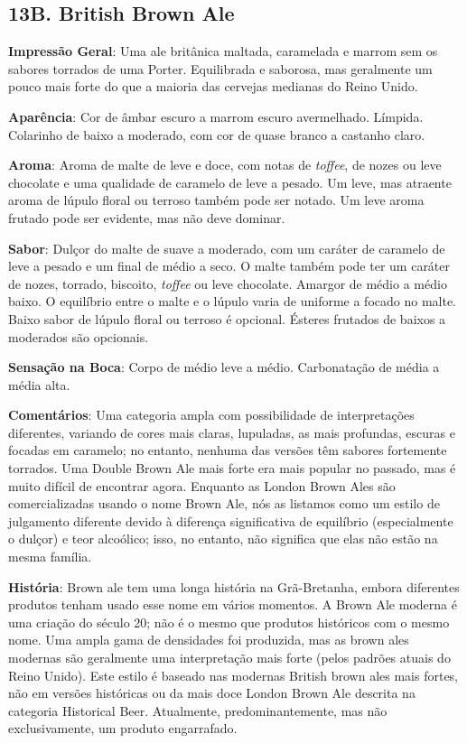 \subsection*{13B. British Brown Ale}

\textbf{Impressão Geral}: Uma ale britânica maltada, caramelada e marrom sem os sabores torrados de uma Porter. Equilibrada e saborosa, mas geralmente um pouco mais forte do que a maioria das cervejas medianas do Reino Unido.

\textbf{Aparência}: Cor de âmbar escuro a marrom escuro avermelhado. Límpida. Colarinho de baixo a moderado, com cor de quase branco a castanho claro.

\textbf{Aroma}: Aroma de malte de leve e doce, com notas de \textit{toffee}, de nozes ou leve chocolate e uma qualidade de caramelo de leve a pesado. Um leve, mas atraente aroma de lúpulo floral ou terroso também pode ser notado. Um leve aroma frutado pode ser evidente, mas não deve dominar.

\textbf{Sabor}: Dulçor do malte de suave a moderado, com um caráter de caramelo de leve a pesado e um final de médio a seco. O malte também pode ter um caráter de nozes, torrado, biscoito, \textit{toffee} ou leve chocolate. Amargor de médio a médio baixo. O equilíbrio entre o malte e o lúpulo varia de uniforme a focado no malte. Baixo sabor de lúpulo floral ou terroso é opcional. Ésteres frutados de baixos a moderados são opcionais.

\textbf{Sensação na Boca}: Corpo de médio leve a médio. Carbonatação de média a média alta.

\textbf{Comentários}: Uma categoria ampla com possibilidade de interpretações diferentes, variando de cores mais claras, lupuladas, as mais profundas, escuras e focadas em caramelo; no entanto, nenhuma das versões têm sabores fortemente torrados. Uma Double Brown Ale mais forte era mais popular no passado, mas é muito difícil de encontrar agora. Enquanto as London Brown Ales são comercializadas usando o nome Brown Ale, nós as listamos como um estilo de julgamento diferente devido à diferença significativa de equilíbrio (especialmente o dulçor) e teor alcoólico; isso, no entanto, não significa que elas não estão na mesma família.

\textbf{História}: Brown ale tem uma longa história na Grã-Bretanha, embora diferentes produtos tenham usado esse nome em vários momentos. A Brown Ale moderna é uma criação do século 20; não é o mesmo que produtos históricos com o mesmo nome. Uma ampla gama de densidades foi produzida, mas as brown ales modernas são geralmente uma interpretação mais forte (pelos padrões atuais do Reino Unido). Este estilo é baseado nas modernas British brown ales mais fortes, não em versões históricas ou da mais doce London Brown Ale descrita na categoria Historical Beer. Atualmente, predominantemente, mas não exclusivamente, um produto engarrafado.


